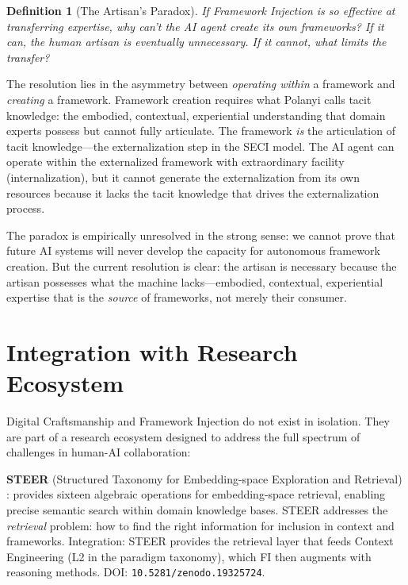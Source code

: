\documentclass[12pt,a4paper]{article}
\newtheorem{definition}{Definition}[section]
\begin{document}
\begin{definition}[The Artisan's Paradox]
If Framework Injection is so effective at transferring expertise, why can't the AI agent create its own frameworks? If it can, the human artisan is eventually unnecessary. If it cannot, what limits the transfer?
\end{definition}

The resolution lies in the asymmetry between \emph{operating within} a framework and \emph{creating} a framework. Framework creation requires what Polanyi \cite{polanyi1966} calls tacit knowledge: the embodied, contextual, experiential understanding that domain experts possess but cannot fully articulate. The framework \emph{is} the articulation of tacit knowledge---the externalization step in the SECI model. The AI agent can operate within the externalized framework with extraordinary facility (internalization), but it cannot generate the externalization from its own resources because it lacks the tacit knowledge that drives the externalization process.

The paradox is empirically unresolved in the strong sense: we cannot prove that future AI systems will never develop the capacity for autonomous framework creation. But the current resolution is clear: the artisan is necessary because the artisan possesses what the machine lacks---embodied, contextual, experiential expertise that is the \emph{source} of frameworks, not merely their consumer.


\section{Integration with Research Ecosystem}
\label{sec:ecosystem}

Digital Craftsmanship and Framework Injection do not exist in isolation. They are part of a research ecosystem designed to address the full spectrum of challenges in human-AI collaboration:

\textbf{STEER} (Structured Taxonomy for Embedding-space Exploration and Retrieval) \cite{gomes2026steer}: provides sixteen algebraic operations for embedding-space retrieval, enabling precise semantic search within domain knowledge bases. STEER addresses the \emph{retrieval} problem: how to find the right information for inclusion in context and frameworks. Integration: STEER provides the retrieval layer that feeds Context Engineering (L2 in the paradigm taxonomy), which FI then augments with reasoning methods. DOI: \texttt{10.5281/zenodo.19325724}.
\end{document}
